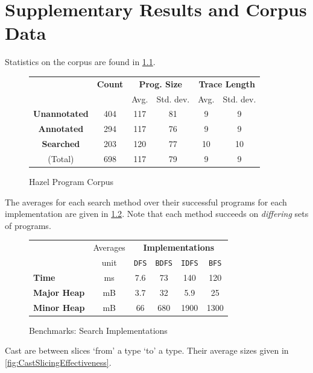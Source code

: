\chapter{Supplementary Results and Corpus Data}
\label{sec:results}
Statistics on the corpus are found in \cref{fig:CorpusStats}.
\begin{figure}[h]
\centering
\begin{tabular}{c|ccccc}
& \textbf{Count} & \multicolumn{2}{c}{\textbf{Prog. Size}}& \multicolumn{2}{c}{\textbf{Trace Length}}\\
&  & Avg. & Std. dev. & Avg. & Std. dev.\\
\hline
\textbf{Unannotated} &404 &117 &81 &9&9\\
\textbf{Annotated} &294 &117 &76 &9&9\\
\textbf{Searched} &203 &120 &77 &10 &10\\
\hline
(Total)  &698 &117 &79 &9 &9\\
\end{tabular}
\caption{Hazel Program Corpus}
\label{fig:CorpusStats}
\end{figure}

The averages for each search method over their successful programs for each implementation are given in \cref{fig:SearchPerformance}. Note that each method succeeds on \textit{differing} sets of programs.

\begin{figure}[h]
  \centering
  \begin{tabular}{lc|cccc}
  & Averages & \multicolumn{4}{c}{\textbf{Implementations}}\\
   & unit & \texttt{DFS} & \texttt{BDFS} & \texttt{IDFS} & \texttt{BFS}\\
   \hline
   \textbf{Time} & ms &  7.6 & 73 & 140 & 120\\
   \textbf{Major Heap} & mB & 3.7 & 32 & 5.9 & 25\\
   \textbf{Minor Heap} & mB & 66 & 680 & 1900 & 1300
  \end{tabular}
  
\caption{Benchmarks: Search Implementations}
\label{fig:SearchPerformance}
\end{figure}


Cast are between slices `from' a type `to' a type. Their average sizes given in \cref{fig:CastSlicingEffectiveness}.

